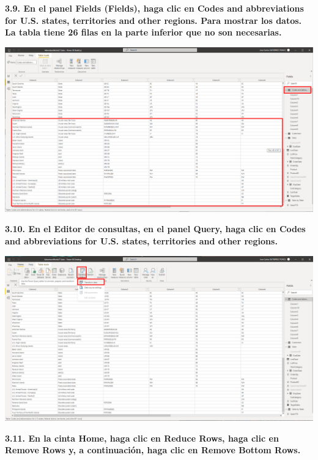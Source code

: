 \documentclass{article}
\begin{document}
\textbf{3.9. En el panel \textbf{Fields} \textbf{(Fields)}, haga clic en \textbf{Codes and abbreviations for U.S. states, territories and other regions}. Para mostrar los datos. La tabla tiene 26 filas en la parte inferior que no son necesarias.}

    \begin{center}
		\includegraphics[width=14cm]{./images/56} 
	\end{center}
\newpage
\textbf{3.10. En el Editor de consultas, en el panel \textbf{Query}, haga clic en \textbf{Codes and abbreviations for U.S. states, territories and other regions}.}

    \begin{center}
		\includegraphics[width=14cm]{./images/57} 
	\end{center}

\textbf{3.11. En la cinta \textbf{Home}, haga clic en \textbf{Reduce Rows}, haga clic en \textbf{Remove Rows} y, a continuación, haga clic en \textbf{Remove Bottom Rows}.}
\end{document}
